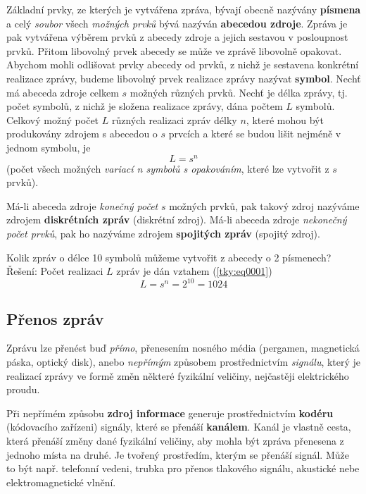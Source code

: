 {    Základní prvky, ze kterých je vytvářena zpráva, bývají obecně nazývány \textbf{písmena} a celý 
    \emph{soubor} všech \emph{možných prvků} bývá nazýván \textbf{abecedou zdroje}. Zpráva je pak 
    vytvářena výběrem prvků z abecedy zdroje a jejich sestavou v posloupnost prvků. Přitom 
    libovolný prvek abecedy se může ve zprávě libovolně opakovat. Abychom mohli odlišovat prvky 
    abecedy od prvků, z nichž je sestavena konkrétní realizace zprávy, budeme libovolný prvek 
    realizace zprávy nazývat \textbf{symbol}. Nechť má abeceda zdroje celkem \(s\) možných různých 
    prvků. Nechť je délka zprávy, tj. počet symbolů, z nichž je složena realizace zprávy, dána 
    počtem \(L\) symbolů. Celkový možný počet \(L\) různých realizaci zpráv délky \(n\), které 
    mohou být produkovány zdrojem s abecedou o \(s\) prvcích a které se budou lišit nejméně v 
    jednom symbolu, je
    \begin{equation}\label{tky:eq0001}
      L = s^n
    \end{equation}
    (počet všech možných \emph{variací n symbolů s opakováním}, které lze vytvořit z \(s\) prvků).
    
    Má-li abeceda zdroje \emph{konečný počet} \(s\) možných prvků, pak takový zdroj nazýváme 
    zdrojem \textbf{diskrétních zpráv} (diskrétní zdroj). Má-li abeceda zdroje \emph{nekonečný 
    počet prvků}, pak ho nazýváme zdrojem \textbf{spojitých zpráv} (spojitý zdroj).
    
    \begin{example}
      Kolik zpráv o délce \num{10} symbolů můžeme vytvořit z abecedy o \num{2} písmenech?
      \newline
      Řešení: Počet realizaci \(L\) zpráv je dán vztahem (\ref{tky:eq0001})
      \begin{equation*}
        L = s^n = 2^{10} = 1024
      \end{equation*}      
    \end{example}
      
    \subsection{Přenos zpráv}
      Zprávu lze přenést buď \emph{přímo}, přenesením nosného média (pergamen, magnetická páska, 
      optický disk), anebo \emph{nepřímým} způsobem prostřednictvím \emph{signálu}, který je 
      realizací zprávy ve formě změn některé fyzikální veličiny, nejčastěji elektrického proudu.
      
      Při nepřímém způsobu \textbf{zdroj informace} generuje prostřednictvím \textbf{kodéru} 
      (kódovacího zařízeni) signály, které se přenáší \textbf{kanálem}. Kanál je vlastně cesta, 
      která přenáší změny dané fyzikální veličiny, aby mohla být zpráva přenesena z jednoho místa 
      na druhé. Je tvořený prostředím, kterým se přenáší signál. Může to být např. telefonní 
      vedeni, trubka pro přenos tlakového signálu, akustické nebe elektromagnetické vlnění.
      
}
